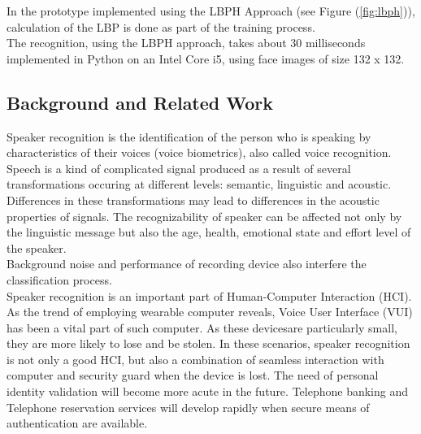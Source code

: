 \documentclass[conference]{IEEEtran}
\begin{document}
In the prototype implemented using the LBPH Approach (see Figure (\ref{fig:lbph})), calculation of the
LBP is done as part of the training process. \\
The recognition, using the LBPH approach, takes about 30 milliseconds
implemented in Python on an Intel Core i5, using face images of size 132 x 132. \\

\subsection{Background and Related Work}
Speaker recognition is the identification of the person who is speaking by
characteristics of their voices (voice biometrics), also called voice recognition. \\
Speech is a kind of complicated signal produced as a result of several transformations
occuring at different levels: semantic, linguistic and acoustic. Differences in these transformations may lead to differences in the acoustic properties of signals. The recognizability of speaker can be affected not only by the linguistic message but also the age, health, emotional state and effort level of the speaker. \\
Background noise and performance of recording device also interfere the classification process. \\
Speaker recognition is an important part of Human-Computer Interaction (HCI). As the trend of employing wearable computer reveals, Voice User Interface (VUI) has been a vital part of such computer. As these devicesare particularly small, they are more likely to lose and be stolen. In these scenarios, speaker recognition is not only a good HCI, but also a combination of seamless interaction with computer and security guard when the device is lost. The need of personal identity validation will become more acute in the future. Telephone banking and Telephone reservation services will develop rapidly when secure means of authentication are available. \\
\end{document}
